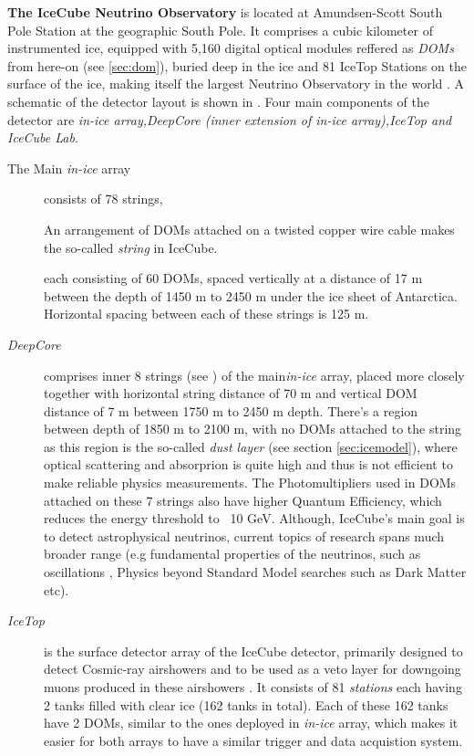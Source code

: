 \textbf{The IceCube Neutrino Observatory} is located at Amundsen-Scott South Pole Station at the geographic South Pole. It comprises a cubic kilometer of instrumented ice, equipped with 5,160 digital optical modules reffered as \emph{DOMs} from here-on (see \ref{sec:dom}), buried deep in the ice and 81 IceTop Stations on the surface of the ice, making itself the largest Neutrino Observatory in the world . A schematic of the detector layout is shown in . Four main components of the detector are \emph{in-ice array,DeepCore (inner extension of in-ice array),IceTop and IceCube Lab}. \par

\begin{description}
	\item[The Main \emph{in-ice} array] consists of 78 strings,\marginnote
    {\begin{kaobox}[title=\textbf{\emph{string} in IceCube}]
        An arrangement of DOMs attached on a twisted copper wire cable makes the so-called \emph{string} in IceCube.
    \end{kaobox}}
    each consisting of 60 DOMs, spaced vertically at a distance of 17 m between the depth of 1450 m to 2450 m under the ice sheet of Antarctica. Horizontal spacing between each of these strings is 125 m.  
	\item[\emph{DeepCore}] comprises inner 8 strings (see ) of the main\emph{in-ice} array, placed more closely together with horizontal string distance of 70 m and vertical DOM distance of 7 m  between 1750 m to 2450 m depth. There's a region between depth of 1850 m to 2100 m, with no DOMs attached to the string as this region is the so-called \emph{dust layer} (see section \ref{sec:icemodel}), where optical scattering and absorprion is quite high and thus is not efficient to make reliable physics measurements. The Photomultipliers used in DOMs attached on these 7 strings also have higher Quantum Efficiency, which reduces the energy threshold to ~10 GeV. Although, IceCube's main goal is to detect astrophysical neutrinos, current topics of research spans much broader range (e.g fundamental properties of the neutrinos, such as oscillations , Physics beyond Standard Model searches such as Dark Matter  etc). 
	\item[\emph{IceTop}] is the surface detector array of the IceCube detector, primarily designed to detect Cosmic-ray airshowers and to be used as a veto layer for downgoing muons produced in these airshowers . It consists of 81 \emph{stations} each having 2 tanks filled with clear ice (162 tanks in total). Each of these 162 tanks have 2 DOMs, similar to the ones deployed in \emph{in-ice} array, which makes it easier for both arrays to have a similar trigger and data acquistion system.

\end{description}
